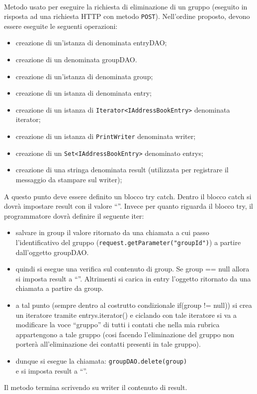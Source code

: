 \begin{description}
	\item{}\\	
	Metodo usato per eseguire la richiesta di eliminazione di un gruppo (eseguito in risposta ad una richiesta HTTP con metodo \texttt{POST}). Nell'ordine proposto, devono essere eseguite le seguenti operazioni:
	\begin{itemize}
		\item creazione di un'istanza di  denominata entryDAO;
		\item creazione di un  denominata groupDAO.
		\item creazione di un'istanza di  denominata group;
		\item creazione di un istanza di  denominata entry;
		\item creazione di un istanza di \texttt{Iterator<IAddressBookEntry>} denominata iterator;
		\item creazione di un istanza di \texttt{PrintWriter} denominata writer;
		\item creazione di un \texttt{Set<IAddressBookEntry>} denominato entrys;
		\item creazione di una stringa denominata result (utilizzata per registrare il messaggio da stampare sul writer);
	\end{itemize} 
	A questo punto deve essere definito un blocco try catch. Dentro il blocco catch si dovrà impostare result con il valore ``''. Invece per quanto riguarda il blocco try, il programmatore dovrà definire il seguente iter:
	\begin{itemize}
		\item salvare in group il valore ritornato da una chiamata  a cui passo l'identificativo del gruppo (\texttt{request.getParameter("groupId")}) a partire dall'oggetto groupDAO.
		\item quindi si esegue una verifica sul contenuto di group. Se group == null allora si imposta result a ``''. Altrimenti si carica in entry l'oggetto ritornato da una chiamata  a partire da group.
		\item a tal punto (sempre dentro al costrutto condizionale if(group != null)) si crea un iteratore tramite entrys.iterator() e ciclando con tale iteratore si va a modificare la voce ``gruppo'' di tutti i contati che nella mia rubrica appartengono a tale gruppo (cosi facendo l'eliminazione del gruppo non porterà all'eliminazione dei contatti presenti in tale gruppo).
		\item dunque si esegue la chiamata:
		\verb|groupDAO.delete(group)|\\
		e si imposta result a ``''.
	\end{itemize}
	Il metodo termina scrivendo su writer il contenuto di result.
	
\end{description}

